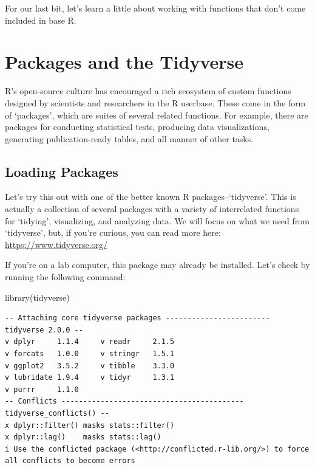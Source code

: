 \documentclass[
  letterpaper,
  DIV=11,
  numbers=noendperiod]{scrreprt}
\newenvironment{Shaded}{\begin{snugshade}}{\end{snugshade}}
\newcommand{\FunctionTok}[1]{\textcolor[rgb]{0.28,0.35,0.67}{#1}}
\newcommand{\NormalTok}[1]{\textcolor[rgb]{0.00,0.23,0.31}{#1}}
\begin{document}
For our last bit, let's learn a little about working with functions that
don't come included in base R.

\chapter{Packages and the Tidyverse}\label{packages-and-the-tidyverse}

R's open-source culture has encouraged a rich ecosystem of custom
functions designed by scientists and researchers in the R userbase.
These come in the form of `packages', which are suites of several
related functions. For example, there are packages for conducting
statistical tests, producing data visualizations, generating
publication-ready tables, and all manner of other tasks.

\section{Loading Packages}\label{loading-packages}

Let's try this out with one of the better known R packages--`tidyverse'.
This is actually a collection of several packages with a variety of
interrelated functions for `tidying', visualizing, and analyzing data.
We will focus on what we need from `tidyverse', but, if you're curious,
you can read more here: \url{https://www.tidyverse.org/}

If you're on a lab computer, this package may already be installed.
Let's check by running the following command:

\begin{Shaded}
\begin{Highlighting}[]
\FunctionTok{library}\NormalTok{(tidyverse)}
\end{Highlighting}
\end{Shaded}

\begin{verbatim}
-- Attaching core tidyverse packages ------------------------ tidyverse 2.0.0 --
v dplyr     1.1.4     v readr     2.1.5
v forcats   1.0.0     v stringr   1.5.1
v ggplot2   3.5.2     v tibble    3.3.0
v lubridate 1.9.4     v tidyr     1.3.1
v purrr     1.1.0     
-- Conflicts ------------------------------------------ tidyverse_conflicts() --
x dplyr::filter() masks stats::filter()
x dplyr::lag()    masks stats::lag()
i Use the conflicted package (<http://conflicted.r-lib.org/>) to force all conflicts to become errors
\end{verbatim}
\end{document}
